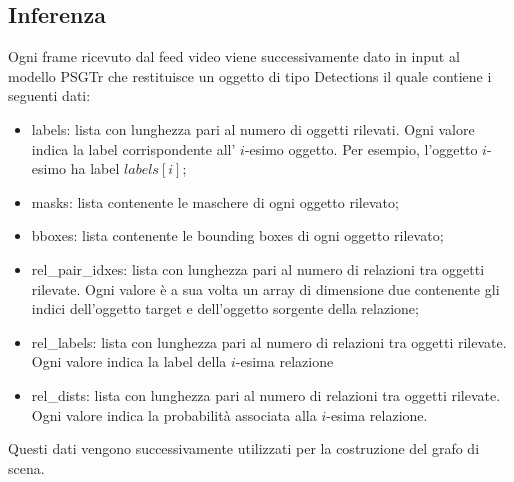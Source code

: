 \subsection{Inferenza}
Ogni frame ricevuto dal feed video viene successivamente dato in input al modello PSGTr \cite{yang2022psg} che restituisce un oggetto di tipo Detections il quale contiene i seguenti dati:
\begin{itemize}
	\item labels: lista con lunghezza pari al numero di oggetti rilevati. Ogni valore indica la label corrispondente all' $i$-esimo oggetto. Per esempio, l'oggetto $i$-esimo ha label $labels[i]$;
	\item masks: lista contenente le maschere di ogni oggetto rilevato;
	\item bboxes: lista contenente le bounding boxes di ogni oggetto rilevato;
	\item rel\_pair\_idxes: lista con lunghezza pari al numero di relazioni tra oggetti rilevate. Ogni valore è a sua volta un array di dimensione due contenente gli indici dell'oggetto target e dell'oggetto sorgente della relazione;
	\item rel\_labels: lista con lunghezza pari al numero di relazioni tra oggetti rilevate. Ogni valore indica la label della $i$-esima relazione
	\item rel\_dists: lista con lunghezza pari al numero di relazioni tra oggetti rilevate. Ogni valore indica la probabilità associata alla $i$-esima relazione.
\end{itemize}
Questi dati vengono successivamente utilizzati per la costruzione del grafo di scena.

